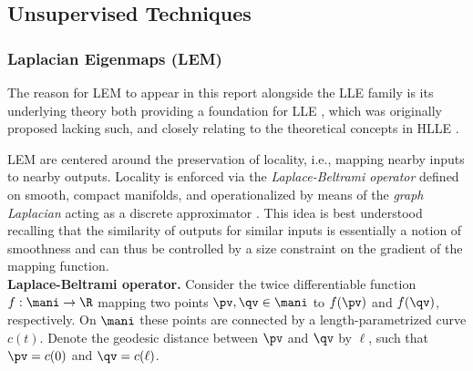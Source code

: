 \subsection{Unsupervised Techniques}
\label{unsupervised}


\subsubsection{Laplacian Eigenmaps (LEM)}
\label{laplace}

The reason for LEM to appear in this report alongside the LLE family is its 
underlying theory both providing a foundation for LLE \citep{belkinniyogi2003}, 
which was originally proposed lacking such, and closely relating to the 
theoretical concepts in HLLE \citep{donohogrimes2003}.

LEM are centered around the preservation of locality, i.e., mapping nearby
inputs to nearby outputs.
Locality is enforced via the \textit{Laplace-Beltrami operator} defined on
smooth, compact manifolds, and operationalized by means of the \textit{graph Laplacian} acting as a discrete approximator \citep{belkinniyogi2003}.
This idea is best understood recalling that the similarity of outputs for
similar inputs is essentially a notion of smoothness and can thus be controlled
by a size constraint on the gradient of the mapping function.
\\

\textbf{Laplace-Beltrami operator.}
Consider the twice differentiable function $f: \mani \rightarrow \R$ mapping
two points $\pv, \qv \in \mani$ to $f(\pv)$ and $f(\qv)$, respectively.
On $\mani$ these points are connected by a length-parametrized curve $c(t)$.
Denote the geodesic distance between $\pv$ and $\qv$ by $\ell$, such that
$\pv = c(0)$ and $\qv = c(\ell)$.

